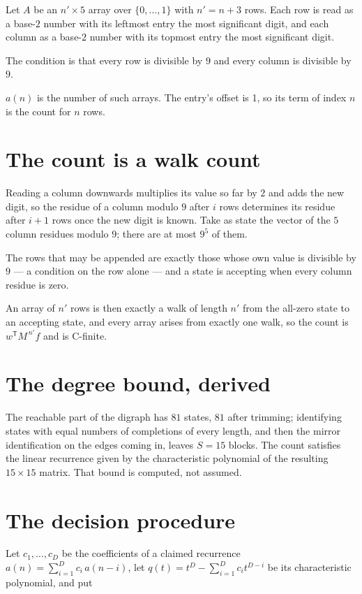 \documentclass[11pt]{article}
\theoremstyle{definition}
\begin{document}
Let $A$ be an $n' \times 5$ array over $\{0,\dots,1\}$ with $n' = n + 3$ rows. Each row is read as a base-$2$ number with its leftmost entry the most significant digit, and each column as a base-$2$ number with its topmost entry the most significant digit.

The condition is that every row is divisible by $9$ and every column is divisible by $9$.

$a(n)$ is the number of such arrays. The entry's offset is 1, so its term of index $n$ is the count for $n$ rows.

\section{The count is a walk count}

Reading a column downwards multiplies its value so far by $2$ and adds the new digit, so the residue of a column modulo $9$ after $i$ rows determines its residue after $i+1$ rows once the new digit is known. Take as state the vector of the $5$ column residues modulo $9$; there are at most $9^{5}$ of them.

The rows that may be appended are exactly those whose own value is divisible by $9$ --- a condition on the row alone --- and a state is accepting when every column residue is zero.

An array of $n'$ rows is then exactly a walk of length $n'$ from the all-zero state to an accepting state, and every array arises from exactly one walk, so the count is $w^{\mathsf T}M^{\,n'}f$ and is C-finite.

\section{The degree bound, derived}

The reachable part of the digraph has $81$ states, $81$ after trimming; identifying states with equal numbers of completions of every length, and then the mirror identification on the edges coming in, leaves $S = 15$ blocks. The count satisfies the linear recurrence given by the characteristic polynomial of the resulting $15\times15$ matrix. That bound is computed, not assumed.

\section{The decision procedure}

Let $c_1,\dots,c_D$ be the coefficients of a claimed recurrence $a(n) = \sum_{i=1}^{D} c_i\,a(n-i)$, let $q(t) = t^{D} - \sum_{i=1}^{D} c_i t^{D-i}$ be its characteristic polynomial, and put
\end{document}
